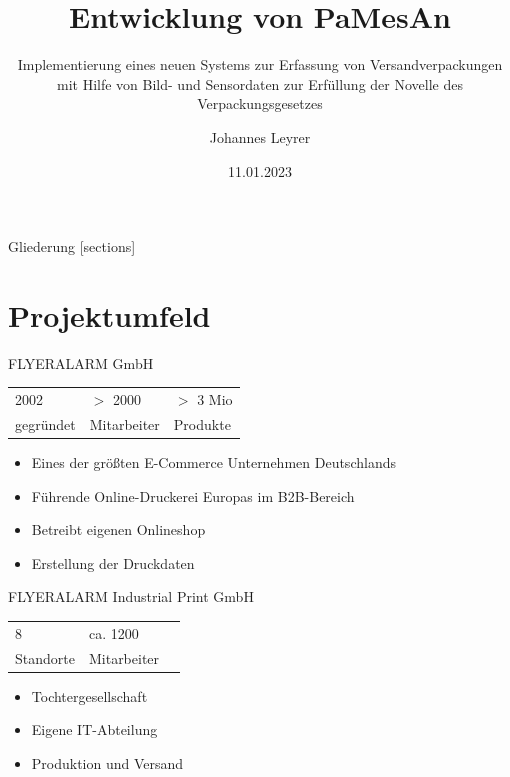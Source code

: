 \documentclass[10pt,ngerman]{beamer}
\title{Entwicklung von PaMesAn}
\date{11.01.2023}
\author{Johannes Leyrer}
\institute{FLYERALARM - Azubi-Nr.: 468322}
\subtitle{Implementierung eines neuen Systems zur Erfassung von Versandverpackungen mit Hilfe von Bild- und Sensordaten zur Erfüllung der Novelle des Verpackungsgesetzes}
\begin{document}
\maketitle

\begin{frame}{Gliederung}
  [sections]
  \tableofcontents[hideallsubsections]
\end{frame}



\section{Projektumfeld}
\begin{frame}[fragile]{FLYERALARM GmbH}

  \begin{table}
    \begin{tabular}{lll}
      2002      & $>$ 2000    & $>$ 3 Mio \\
      gegründet & Mitarbeiter & Produkte  \\
    \end{tabular}
  \end{table}

  \pause

  \begin{itemize}
    \item Eines der größten E-Commerce Unternehmen Deutschlands
          \pause
    \item Führende Online-Druckerei Europas im B2B-Bereich
          \pause
    \item Betreibt eigenen Onlineshop
          \pause
    \item Erstellung der Druckdaten
  \end{itemize}
\end{frame}


\begin{frame}[fragile]{FLYERALARM Industrial Print GmbH}

  \begin{table}
    \begin{tabular}{lll}
      8         & ca. 1200    \\
      Standorte & Mitarbeiter \\
    \end{tabular}
  \end{table}

  \pause

  \begin{itemize}
    \item Tochtergesellschaft
          \pause
    \item Eigene IT-Abteilung
          \pause
    \item Produktion und Versand
  \end{itemize}
\end{frame}
\end{document}
